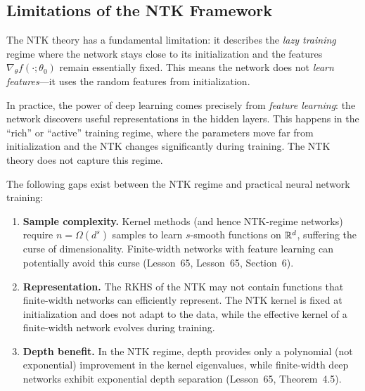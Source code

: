 \documentclass[11pt,a4paper]{article}
\begin{document}
\subsection{Limitations of the NTK Framework}

\begin{remark}
\label{rem:feature-learning}
The NTK theory has a fundamental limitation: it describes the
\emph{lazy training} regime where the network stays close to its
initialization and the features $\nabla_\theta f(\cdot; \theta_0)$
remain essentially fixed.  This means the network does not
\emph{learn features}---it uses the random features from initialization.

In practice, the power of deep learning comes precisely from
\emph{feature learning}: the network discovers useful representations
in the hidden layers.  This happens in the ``rich'' or ``active''
training regime, where the parameters move far from initialization
and the NTK changes significantly during training.  The NTK theory
does not capture this regime.
\end{remark}

\begin{proposition}
\label{prop:ntk-limitations}
The following gaps exist between the NTK regime and practical neural
network training:
\begin{enumerate}[nosep,label=(\roman*)]
  \item \textbf{Sample complexity.}  Kernel methods (and hence
    NTK-regime networks) require $n = \Omega(d^s)$ samples to learn
    $s$-smooth functions on $\mathbb{R}^d$, suffering the curse of
    dimensionality.  Finite-width networks with feature learning can
    potentially avoid this curse (Lesson~65,
    Lesson~65, Section~6).
  \item \textbf{Representation.}  The RKHS of the NTK may not contain
    functions that finite-width networks can efficiently represent.
    The NTK kernel is fixed at initialization and does not adapt to
    the data, while the effective kernel of a finite-width network
    evolves during training.
  \item \textbf{Depth benefit.}  In the NTK regime, depth provides
    only a polynomial (not exponential) improvement in the kernel
    eigenvalues, while finite-width deep networks exhibit exponential
    depth separation (Lesson~65, Theorem~4.5).
\end{enumerate}
\end{proposition}
\end{document}
